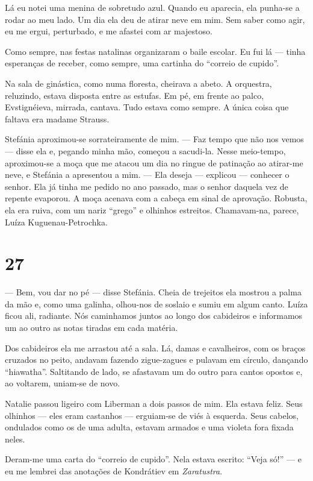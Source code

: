 Lá eu notei uma menina de sobretudo azul. Quando eu aparecia, ela
punha-se a rodar ao meu lado. Um dia ela deu de atirar neve em mim. Sem
saber como agir, eu me ergui, perturbado, e me afastei com ar majestoso.

Como sempre, nas festas natalinas organizaram o baile escolar. Eu fui lá
--- tinha esperanças de receber, como sempre, uma cartinha do ``correio
de cupido''.

Na sala de ginástica, como numa floresta, cheirava a abeto. A orquestra,
reluzindo, estava disposta entre as estufas. Em pé, em frente ao palco,
Evstignéieva, mirrada, cantava. Tudo estava como sempre. A única coisa
que faltava era madame Strauss.

Stefánia aproximou-se sorrateiramente de mim. --- Faz tempo que não nos
vemos --- disse ela e, pegando minha mão, começou a sacudi-la. Nesse
meio-tempo, aproximou-se a moça que me atacou um dia no ringue de
patinação ao atirar-me neve, e Stefánia a apresentou a mim. --- Ela
deseja --- explicou --- conhecer o senhor. Ela já tinha me pedido no ano
passado, mas o senhor daquela vez de repente evaporou. A moça acenava
com a cabeça em sinal de aprovação. Robusta, ela era ruiva, com um nariz
``grego'' e olhinhos estreitos. Chamavam-na, parece, Luíza
Kuguenau-Petrochka.

\section{27}

--- Bem, vou dar no pé --- disse Stefánia. Cheia de trejeitos ela
mostrou a palma da mão e, como uma galinha, olhou-nos de soslaio e sumiu
em algum canto. Luíza ficou ali, radiante. Nós caminhamos juntos ao
longo dos cabideiros e informamos um ao outro as notas tiradas em cada
matéria.

Dos cabideiros ela me arrastou até a sala. Lá, damas e cavalheiros, com
os braços cruzados no peito, andavam fazendo zigue-zagues e pulavam em
círculo, dançando ``hiawatha''. Saltitando de lado, se afastavam um do
outro para cantos opostos e, ao voltarem, uniam-se de novo.

Natalie passou ligeiro com Liberman a dois passos de mim. Ela estava
feliz. Seus olhinhos --- eles eram castanhos --- erguiam-se de viés à
esquerda. Seus cabelos, ondulados como os de uma adulta, estavam armados
e uma violeta fora fixada neles.

Deram-me uma carta do ``correio de cupido''. Nela estava escrito: ``Veja
só!'' --- e eu me lembrei das anotações de Kondrátiev em
\emph{Zaratustra}.

